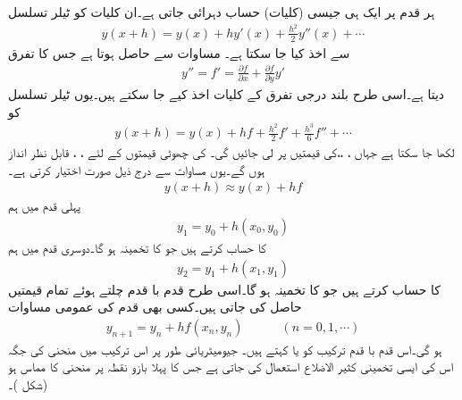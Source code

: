 ہر قدم پر ایک ہی جیسی (کلیات) حساب دہرائی جاتی ہے۔ان کلیات کو ٹیلر تسلسل
\begin{align*}
y(x+h)=y(x)+hy'(x)+\frac{h^2}{2}y''(x)+\cdots
\end{align*}
 سے اخذ کیا جا سکتا ہے۔ مساوات  سے  حاصل ہوتا ہے جس  کا تفرق
\begin{align*}
y''=f'=\tfrac{\partial f}{\partial x}+\tfrac{\partial f}{\partial y}y'
\end{align*}
دیتا ہے۔اسی طرح بلند درجی تفرق کے کلیات اخذ کیے جا سکتے ہیں۔یوں ٹیلر تسلسل کو
\begin{align}\label{مساوات_اعدادی_ابتدائی_مسئلہ_ب}
y(x+h)=y(x)+hf+\frac{h^2}{2}f'+\frac{h^3}{6}f''+\cdots
\end{align}
لکھا جا سکتا ہے جہاں ، ،، کی قیمتیں  پر  لی جائیں گی۔ کی چھوٹی قیمتوں کے لئے ، ،  قابل نظر انداز ہوں گے۔یوں مساوات  سے درج ذیل صورت اختیار کرتی ہے۔
\begin{align*}
y(x+h)\approx y(x)+hf
\end{align*}
پہلی قدم میں ہم 
\begin{align*}
y_1=y_0+h(x_0,y_0)
\end{align*}
کا حساب کرتے ہیں جو  کا تخمینہ ہو گا۔دوسری قدم میں ہم
 \begin{align*}
y_2=y_1+h(x_1,y_1)
\end{align*}
کا حساب کرتے ہیں جو  کا تخمینہ ہو گا۔اسی طرح قدم با قدم چلتے ہوئے تمام قیمتیں حاصل کی جاتی ہیں۔کسی بھی قدم کی عمومی مساوات
\begin{align}\label{مساوات_اعدادی_ابتدائی_مسئلہ_پ}
y_{n+1}=y_n+hf(x_n,y_n)\quad\quad\quad (n=0,1,\cdots)
\end{align}
ہو گی۔اس قدم با قدم ترکیب کو  یا  کہتے ہیں۔ جیومیٹریائی طور پر اس ترکیب میں  منحنی  کی جگہ اس کی ایسی تخمینی کثیر الاضلاع استعمال کی جاتی ہے جس کا پہلا بازو نقطہ  پر منحنی کا مماس ہو (شکل )۔
